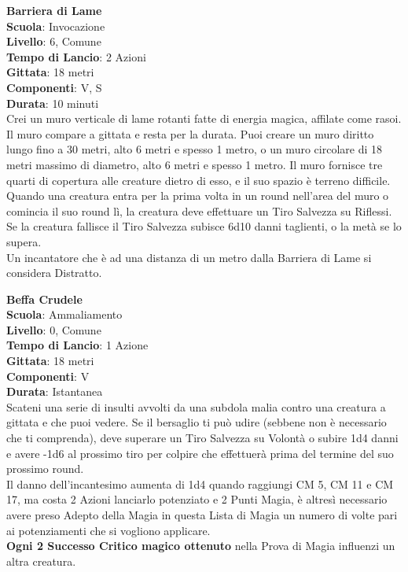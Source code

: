 \begin{multicols}{2}
\medskip\textbf{Barriera di Lame}\\
\textbf{Scuola}: Invocazione\\
\textbf{Livello}: 6, Comune\\
\textbf{Tempo di Lancio}: 2 Azioni\\
\textbf{Gittata}: 18 metri\\
\textbf{Componenti}: V, S\\
\textbf{Durata}: 10 minuti \\
Crei un muro verticale di lame rotanti fatte di energia magica, affilate come rasoi. Il muro compare a gittata e resta per la durata. Puoi creare un muro diritto lungo fino a 30 metri, alto 6 metri e spesso 1 metro, o un muro circolare di 18 metri massimo di diametro, alto 6 metri e spesso 1 metro. Il muro fornisce tre quarti di copertura alle creature dietro di esso, e il suo spazio è terreno difficile. \\
Quando una creatura entra per la prima volta in un round nell'area del muro o comincia il suo round lì, la creatura deve effettuare un Tiro Salvezza su Riflessi. Se la creatura fallisce il Tiro Salvezza subisce 6d10 danni taglienti, o la metà se lo supera.\\
Un incantatore che è ad una distanza di un metro dalla Barriera di Lame si considera Distratto.

\medskip\textbf{Beffa Crudele}\\
\textbf{Scuola}: Ammaliamento\\
\textbf{Livello}: 0, Comune\\
\textbf{Tempo di Lancio}: 1 Azione\\
\textbf{Gittata}: 18 metri\\
\textbf{Componenti}: V\\
\textbf{Durata}: Istantanea\\
Scateni una serie di insulti avvolti da una subdola malia contro una creatura a gittata e che puoi vedere. Se il bersaglio ti può udire (sebbene non è necessario che ti comprenda), deve superare un Tiro Salvezza su Volontà o subire 1d4 danni e avere -1d6 al prossimo tiro per colpire che effettuerà prima del termine del suo prossimo round.\\
Il danno dell'incantesimo aumenta di 1d4 quando raggiungi CM 5, CM 11 e CM 17, ma costa 2 Azioni lanciarlo potenziato e 2 Punti Magia, è altresì necessario avere preso Adepto della Magia in questa Lista di Magia un numero di volte pari ai potenziamenti che si vogliono applicare.\\
\textbf{Ogni 2 Successo Critico magico ottenuto} nella Prova di Magia influenzi un altra creatura.


\end{multicols}
